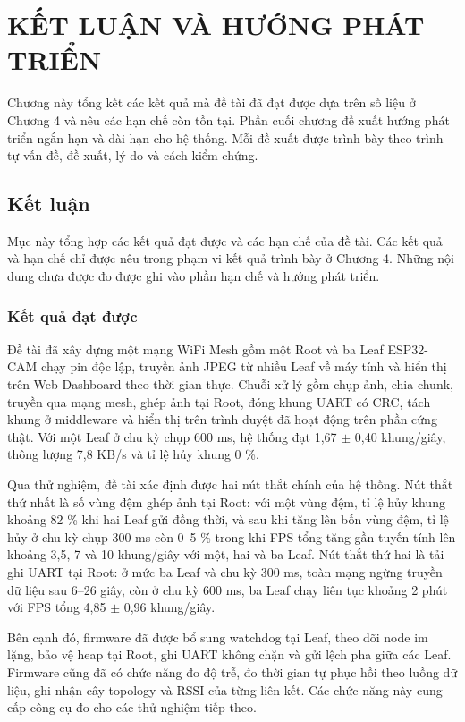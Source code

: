 \chapter{KẾT LUẬN VÀ HƯỚNG PHÁT TRIỂN}\label{chap:5}

Chương này tổng kết các kết quả mà đề tài đã đạt được dựa trên số liệu ở Chương 4 và nêu các hạn chế còn tồn tại. Phần cuối chương đề xuất hướng phát triển ngắn hạn và dài hạn cho hệ thống. Mỗi đề xuất được trình bày theo trình tự vấn đề, đề xuất, lý do và cách kiểm chứng.


\section{Kết luận}

Mục này tổng hợp các kết quả đạt được và các hạn chế của đề tài. Các kết quả và hạn chế chỉ được nêu trong phạm vi kết quả trình bày ở Chương 4. Những nội dung chưa được đo được ghi vào phần hạn chế và hướng phát triển.

\subsection{Kết quả đạt được}

Đề tài đã xây dựng một mạng WiFi Mesh gồm một Root và ba Leaf ESP32-CAM chạy pin độc lập, truyền ảnh JPEG từ nhiều Leaf về máy tính và hiển thị trên Web Dashboard theo thời gian thực. Chuỗi xử lý gồm chụp ảnh, chia chunk, truyền qua mạng mesh, ghép ảnh tại Root, đóng khung UART có CRC, tách khung ở middleware và hiển thị trên trình duyệt đã hoạt động trên phần cứng thật. Với một Leaf ở chu kỳ chụp 600 ms, hệ thống đạt 1,67 $\pm$ 0,40 khung/giây, thông lượng 7,8 KB/s và tỉ lệ hủy khung 0 \%.

Qua thử nghiệm, đề tài xác định được hai nút thắt chính của hệ thống. Nút thắt thứ nhất là số vùng đệm ghép ảnh tại Root: với một vùng đệm, tỉ lệ hủy khung khoảng 82 \% khi hai Leaf gửi đồng thời, và sau khi tăng lên bốn vùng đệm, tỉ lệ hủy ở chu kỳ chụp 300 ms còn 0–5 \% trong khi FPS tổng tăng gần tuyến tính lên khoảng 3,5, 7 và 10 khung/giây với một, hai và ba Leaf. Nút thắt thứ hai là tải ghi UART tại Root: ở mức ba Leaf và chu kỳ 300 ms, toàn mạng ngừng truyền dữ liệu sau 6–26 giây, còn ở chu kỳ 600 ms, ba Leaf chạy liên tục khoảng 2 phút với FPS tổng 4,85 $\pm$ 0,96 khung/giây.

Bên cạnh đó, firmware đã được bổ sung watchdog tại Leaf, theo dõi node im lặng, bảo vệ heap tại Root, ghi UART không chặn và gửi lệch pha giữa các Leaf. Firmware cũng đã có chức năng đo độ trễ, đo thời gian tự phục hồi theo luồng dữ liệu, ghi nhận cây topology và RSSI của từng liên kết. Các chức năng này cung cấp công cụ đo cho các thử nghiệm tiếp theo.

